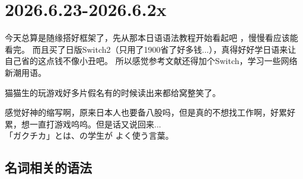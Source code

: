 \section{2026.6.23-2026.6.2x}

今天总算是随缘搭好框架了，先从那本日语语法教程开始看起吧
\cite{徐卫日语语法教程}，慢慢看应该能看完。
而且买了日版Switch2（只用了1900省了好多钱...），真得好好学日语来让自己省的这点钱不像小丑吧。
所以感觉参考文献还得加个Switch\cite{Switch系统}，学习一些网络新潮用语。
\par 猫猫生的玩游戏好多片假名有的时候读出来都给窝整笑了。
\\
\begin{vocab}
\end{vocab}
感觉好神的缩写啊，原来日本人也要备八股吗，但是真的不想找工作啊，好累好累，想一直打游戏呜呜。但是话又说回来...
\\
「ガクチカ」とは、の学生が よく使う言葉。


\subsection{名词相关的语法}